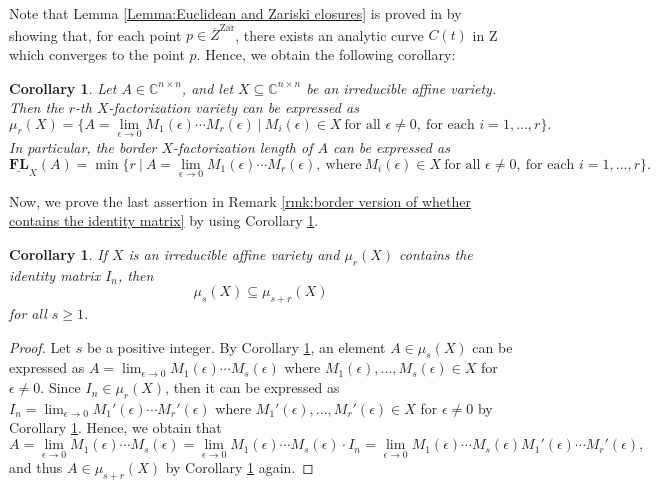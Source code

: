 \documentclass[reqno]{amsart}
\newtheorem{corollary}[theorem]{Corollary}
\theoremstyle{definition}
\numberwithin{equation}{section}
\begin{document}
Note that Lemma \ref{Lemma:Euclidean and Zariski closures} is proved in \cite{landsberg2017geometry} by showing that, for each point  $p \in \overline{Z}^{\text{Zar}}$, there exists an analytic curve $C(t)$ in Z which converges to the point $p$. Hence, we obtain the following corollary: 

\begin{corollary}\label{cor:limit expression}
    Let $A \in \mathbb{C}^{n \times n}$, and let $X \subseteq \mathbb{C}^{n \times n}$ be an irreducible affine variety. Then the $r$-th $X$-factorization variety can be expressed as
    \begin{equation*}
        \mu_r(X)=\{A=\lim_{\epsilon \rightarrow 0}M_1(\epsilon)\cdots M_r(\epsilon)~|~M_{i}(\epsilon) \in X~\text{for all $\epsilon \neq 0$},~\text{for each $i=1,...,r$}\}.
    \end{equation*}
    In particular, the border $X$-factorization length of $A$ can be expressed as
    \begin{equation*}
        \underline{\mathbf{FL}}_X(A)=\min\{r~|~A=\lim_{\epsilon \rightarrow 0}M_1(\epsilon)\cdots M_r(\epsilon),~\text{where}~M_{i}(\epsilon) \in X~\text{for all $\epsilon \neq 0$},~\text{for each $i=1,...,r$}\}.
    \end{equation*}
\end{corollary}

Now, we prove the last assertion in Remark \ref{rmk:border version of whether contains the identity matrix} by using Corollary \ref{cor:limit expression}.

\begin{corollary}\label{cor:when the identity matrix is on the closure}
    If $X$ is an irreducible affine variety and $\mu_r(X)$ contains the identity matrix $I_n$, then
    \begin{equation*}
        \mu_s(X) \subseteq \mu_{s+r}(X)
    \end{equation*}
    for all $s \geq1$.
\end{corollary}
\begin{proof}
    Let $s$ be a positive integer. By Corollary \ref{cor:limit expression}, an element $A \in \mu_s(X)$ can be expressed as $A=\lim_{\epsilon \rightarrow 0} M_1(\epsilon)\cdots M_s(\epsilon)$ where $M_1(\epsilon),...,M_s(\epsilon) \in X$ for $\epsilon \neq 0$. Since $I_n \in \mu_r(X)$, then it can be expressed as $I_n=\lim_{\epsilon \rightarrow 0} M_1'(\epsilon)\cdots M_r'(\epsilon)$ where $M_1'(\epsilon),...,M_r'(\epsilon) \in X$ for $\epsilon \neq 0$ by Corollary \ref{cor:limit expression}. Hence, we obtain that
    \begin{equation*}
        A=\lim_{\epsilon \rightarrow 0}M_1(\epsilon)\cdots M_s(\epsilon)=\lim_{\epsilon \rightarrow 0}M_1(\epsilon)\cdots M_s(\epsilon) \cdot I_n =\lim_{\epsilon \rightarrow 0}M_1(\epsilon)\cdots M_s(\epsilon)M_1'(\epsilon)\cdots M_r'(\epsilon),
    \end{equation*}
    and thus $A \in \mu_{s+r}(X)$ by Corollary \ref{cor:limit expression} again.
\end{proof}
\end{document}
